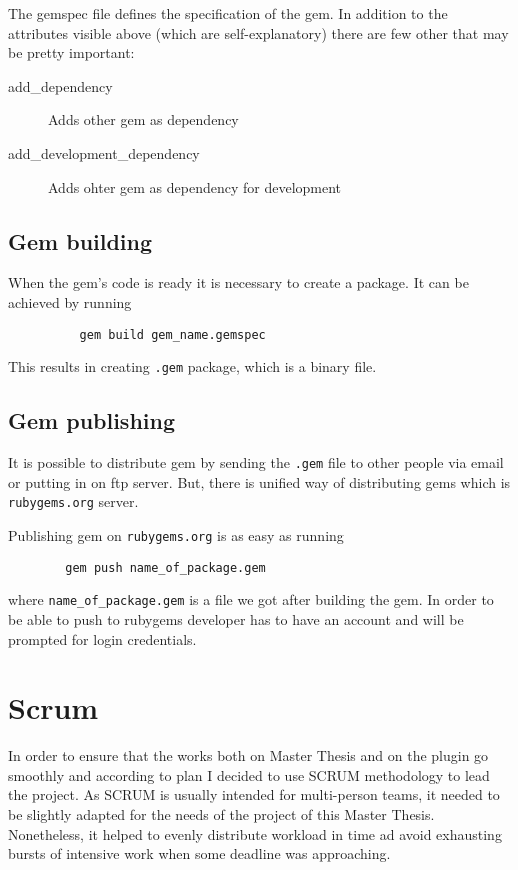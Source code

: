       

      The gemspec file defines the specification of the gem. In addition to the attributes visible
      above (which are self-explanatory) there are few other that may be pretty important:
      \begin{description}
        \item[add\_dependency] Adds other gem as dependency
        \item[add\_development\_dependency] Adds ohter gem as dependency for development
      \end{description}

    \subsection{Gem building}
      When the gem's code is ready it is necessary to create a package. It can be achieved by running

       \begin{lstlisting}
          gem build gem_name.gemspec
        \end{lstlisting}

      This results in creating \texttt{.gem} package, which is a binary file.

    \subsection{Gem publishing}
      It is possible to distribute gem by sending the \texttt{.gem} file to other people via email or
      putting in on ftp server. But, there is unified way of distributing gems which is
      \texttt{rubygems.org} server.

      Publishing gem on \texttt{rubygems.org} is as easy as running

      \begin{lstlisting}
        gem push name_of_package.gem
       \end{lstlisting}

      where \texttt{name\_of\_package.gem} is a file we got after building the gem. In order to be able to
      push to rubygems developer has to have an account and will be prompted for login credentials.
  \section{Scrum}
    In order to ensure that the works both on Master Thesis and on the plugin go smoothly and according to
    plan I decided to use SCRUM methodology to lead the project. As SCRUM is usually intended for
    multi-person teams, it needed to be slightly adapted for the needs of the project of this Master Thesis.
    Nonetheless, it helped to evenly distribute workload in time ad avoid exhausting bursts of intensive work
    when some deadline was approaching.

